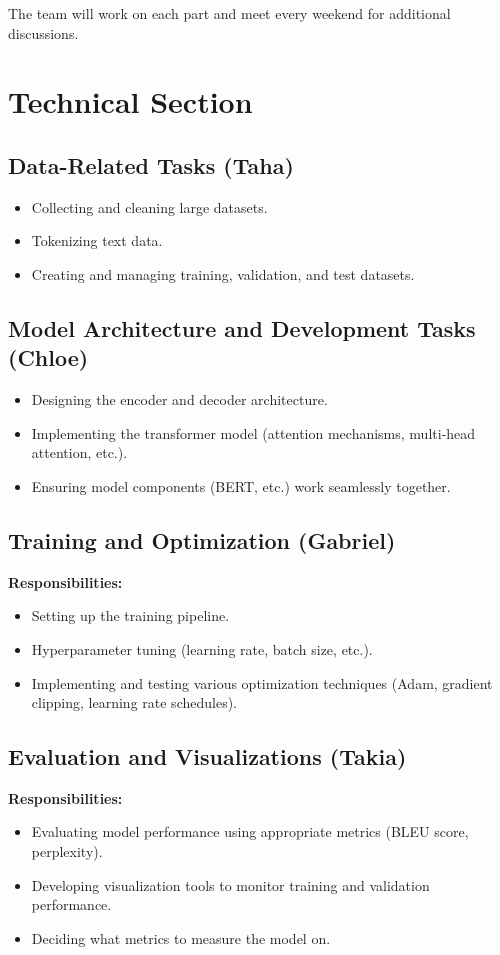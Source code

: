 \documentclass{article}
\begin{document}
The team will work on each part and meet every weekend for additional discussions.

\section*{Technical Section}

\subsection*{Data-Related Tasks (Taha)}
\begin{itemize}
  \item Collecting and cleaning large datasets.
  \item Tokenizing text data.
  \item Creating and managing training, validation, and test datasets.
\end{itemize}

\subsection*{Model Architecture and Development Tasks (Chloe)}
\begin{itemize}
  \item Designing the encoder and decoder architecture.
  \item Implementing the transformer model (attention mechanisms, multi-head attention, etc.).
  \item Ensuring model components (BERT, etc.) work seamlessly together.
\end{itemize}

\subsection*{Training and Optimization (Gabriel)}
\textbf{Responsibilities:}
\begin{itemize}
  \item Setting up the training pipeline.
  \item Hyperparameter tuning (learning rate, batch size, etc.).
  \item Implementing and testing various optimization techniques (Adam, gradient clipping, learning rate schedules).
\end{itemize}

\subsection*{Evaluation and Visualizations (Takia)}
\textbf{Responsibilities:}
\begin{itemize}
  \item Evaluating model performance using appropriate metrics (BLEU score, perplexity).
  \item Developing visualization tools to monitor training and validation performance.
  \item Deciding what metrics to measure the model on.
\end{itemize}
\end{document}
